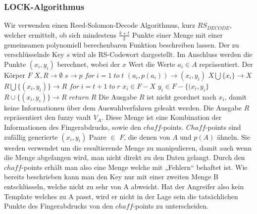 \documentclass[12pt,a4paper]{article}
\begin{document}
\subsubsection{LOCK-Algorithmus}
Wir verwenden einen Reed-Solomon-Decode Algorithmus, kurz $RS_{DECODE}$, welcher ermittelt, ob sich mindestens $\frac{k+t}{2}$ Punkte einer Menge mit einer gemeinsamen polynomiell berechenbaren Funktion beschreiben lassen. Der zu verschlüsselnde Key $s$ wird als RS-Codewort dargestellt. Im Anschluss werden die Punkte $(x_{i}, y_{i})$ berechnet, wobei der $x$ Wert die Werte $a_{i} \in A$ repräsentiert. Der Körper $F$ 
\newline
\hspace*{10mm}$ X,R\rightarrow \emptyset$ \newline
\hspace*{10mm}$s \rightarrow p$\newline
\hspace*{10mm}$for \; i=1 \; to \; t $\newline
\hspace*{15mm}$(a_{i}, p(a_{i})) \rightarrow (x_{i}, y_{i})$\newline
\hspace*{15mm}$X\bigcup \{x_{i}\} \rightarrow X$\newline
\hspace*{15mm}$R\bigcup \{(x_{i},y_{i})\} \rightarrow R$\newline
\hspace*{10mm}$for \; i=t+1 \; to \; r$\newline
\hspace*{15mm}$x_{i} \in F - X$\newline
\hspace*{15mm}$y_{i} \in F - \{ (x_{i},y_{i} \}$\newline
\hspace*{15mm}$R\cup \{(x_{i},y_{i})\} \rightarrow R$\newline
\hspace*{10mm}$return\;R$\newline
\newline
Die Ausgabe $R$ ist nicht geordnet nach $x_i$, damit keine Informationen über dem Auswahlverfahren geleakt werden. Die Ausgabe $R$ repräsentiert den fuzzy vault $V_{A}$. Diese Menge ist eine Kombination der Informationen des Fingerabdrucks, sowie den $chaff$-points. $Chaff$-points sind zufällig generierte $(x_{i},y_{i})$ Paare $\in$ $F$, die denen von $A$ und $p(A)$ ähneln. Sie werden verwendet um die resultierende Menge zu manipulieren, damit auch wenn die Menge abgefangen wird, man nicht direkt zu den Daten gelangt. Durch den $chaff$-points erhält man also eine Menge welche mit „Fehlern“ behaftet ist. Wie bereits beschrieben kann man den Key nur mit einer zweiten Menge B entschlüsseln, welche nicht zu sehr von A abweicht. Hat der Angreifer also kein Template welches zu A passt, wird er nicht in der Lage sein die tatsächlichen Punkte des Fingerabdrucks von den $chaff$-points zu unterscheiden. 
\end{document}
